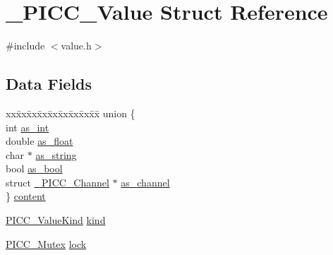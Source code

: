 \hypertarget{struct__PICC__Value}{\section{\-\_\-\-P\-I\-C\-C\-\_\-\-Value Struct Reference}
\label{struct__PICC__Value}
}


{\ttfamily \#include $<$value.\-h$>$}

\subsection*{Data Fields}
\begin{DoxyCompactItemize}
\item 
\begin{tabbing}
xx\=xx\=xx\=xx\=xx\=xx\=xx\=xx\=xx\=\kill
union \{\\
\>int \hyperlink{struct__PICC__Value_a9a5694c2d3ca43921fd537cf7f653a82}{as\_int}\\
\>double \hyperlink{struct__PICC__Value_a9ef852abed242872ec66473b1dbf52ce}{as\_float}\\
\>char $\ast$ \hyperlink{struct__PICC__Value_a32aa118c757eaf418d2dbfd2182b3242}{as\_string}\\
\>bool \hyperlink{struct__PICC__Value_a325709a2dce45972f933f358f0546327}{as\_bool}\\
\>struct \hyperlink{struct__PICC__Channel}{\_PICC\_Channel} $\ast$ \hyperlink{struct__PICC__Value_a5b09e392f74cf7a493e0524c904b0ea2}{as\_channel}\\
\} \hyperlink{struct__PICC__Value_ae479e83bf66b91bb89f7b7dd5b19f2b5}{content}\\

\end{tabbing}\end{DoxyCompactItemize}
{\bf }\par
\begin{DoxyCompactItemize}
\item 
\hyperlink{value_8h_aa36f34a9037f3bd711984b08dfc22c15}{P\-I\-C\-C\-\_\-\-Value\-Kind} \hyperlink{struct__PICC__Value_a3daeb493d6690c977813226ce2f50421}{kind}
\item 
\hyperlink{sync_8h_a600a20a1dd394c06182a81d72e3357f4}{P\-I\-C\-C\-\_\-\-Mutex} \hyperlink{struct__PICC__Value_aa81746d9bb365cc0a8f8229780b70e78}{lock}
\end{DoxyCompactItemize}

{\bf }\par



